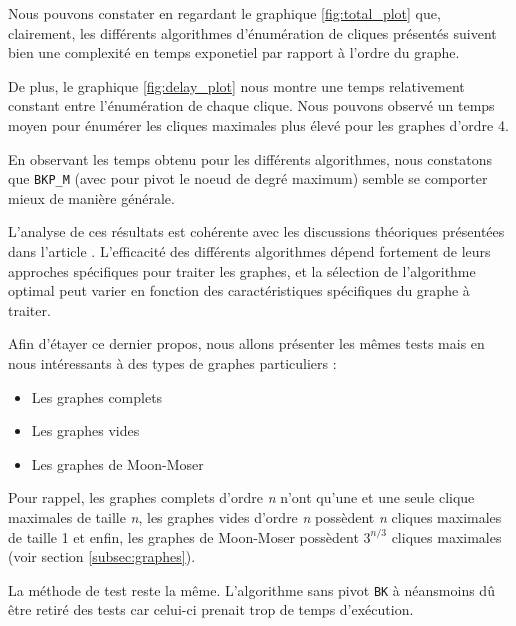 \documentclass[12pt,a4paper]{article}
\begin{document}
Nous pouvons constater en regardant le graphique \ref{fig:total_plot} que, clairement, les différents algorithmes d'énumération de cliques présentés suivent bien une complexité en temps exponetiel par rapport à l'ordre du graphe.

De plus, le graphique \ref{fig:delay_plot} nous montre une temps relativement constant entre l'énumération de chaque clique. Nous pouvons observé un temps moyen pour énumérer les cliques maximales plus élevé pour les graphes d'ordre 4.

En observant les temps obtenu pour les différents algorithmes, nous constatons que \texttt{BKP\_M} (avec pour pivot le noeud de degré maximum) semble se comporter mieux de manière générale.

L'analyse de ces résultats est cohérente avec les discussions théoriques présentées dans l'article \cite{CONTE20221}. L'efficacité des différents algorithmes dépend fortement de leurs approches spécifiques pour traiter les graphes, et la sélection de l'algorithme optimal peut varier en fonction des caractéristiques spécifiques du graphe à traiter.

Afin d'étayer ce dernier propos, nous allons présenter les mêmes tests mais en nous intéressants à des types de graphes particuliers :
\begin{itemize}
  \item Les graphes complets
  \item Les graphes vides
  \item Les graphes de Moon-Moser
\end{itemize}
Pour rappel, les graphes complets d'ordre \emph{n} n'ont qu'une et une seule clique maximales de taille \emph{n}, les graphes vides d'ordre \emph{n} possèdent \emph{n} cliques maximales de taille 1 et enfin, les graphes de Moon-Moser possèdent \(3^{n/3}\) cliques maximales (voir section \ref{subsec:graphes}).

La méthode de test reste la même. L'algorithme sans pivot \texttt{BK} à néansmoins dû être retiré des tests car celui-ci prenait trop de temps d'exécution.
\end{document}
